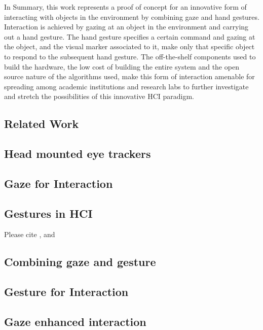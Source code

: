 \documentclass[jou,a4paper,notxfonts]{apa}
\begin{document}
In Summary, this work represents a proof of concept for an innovative form of interacting with objects in the
environment by combining gaze and hand gestures. Interaction is achieved by gazing at an object in the environment and
carrying out a hand gesture. The hand gesture specifies a certain command and gazing at the object, and the visual
marker associated to it, make only that specific object to respond to the subsequent hand gesture. The off-the-shelf components
used to build the hardware, the low cost of building the entire system and the open source nature of the algorithms
used, make this form of interaction amenable for spreading among academic institutions and research labs to further
investigate and stretch the possibilities of this innovative HCI paradigm.

\subsection{Related Work}
\subsection{Head mounted eye trackers}

\subsection{Gaze for Interaction}
\subsection{Gestures in HCI}
Please cite \cite{Rozado2012a}, \cite{mardanbegi2012eye} and \cite{Rozado2012} 

\subsection{Combining gaze and gesture}
\subsection{Gesture for Interaction}
%
\subsection{Gaze enhanced interaction }
\end{document}
